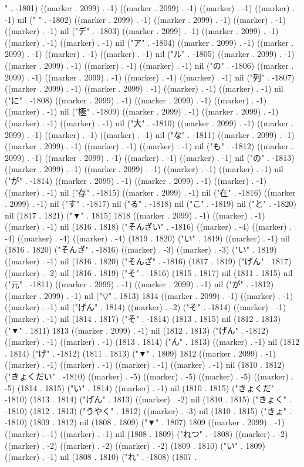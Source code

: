 " . -1801) ((marker . 2099) . -1) ((marker . 2099) . -1) ((marker) . -1) ((marker) . -1) nil (" " . -1802) ((marker . 2099) . -1) ((marker . 2099) . -1) ((marker) . -1) ((marker) . -1) nil ("デ" . -1803) ((marker . 2099) . -1) ((marker . 2099) . -1) ((marker) . -1) ((marker) . -1) nil ("ア" . -1804) ((marker . 2099) . -1) ((marker . 2099) . -1) ((marker) . -1) ((marker) . -1) nil ("ル" . -1805) ((marker . 2099) . -1) ((marker . 2099) . -1) ((marker) . -1) ((marker) . -1) nil ("の" . -1806) ((marker . 2099) . -1) ((marker . 2099) . -1) ((marker) . -1) ((marker) . -1) nil ("列" . -1807) ((marker . 2099) . -1) ((marker . 2099) . -1) ((marker) . -1) ((marker) . -1) nil ("に" . -1808) ((marker . 2099) . -1) ((marker . 2099) . -1) ((marker) . -1) ((marker) . -1) nil ("極" . -1809) ((marker . 2099) . -1) ((marker . 2099) . -1) ((marker) . -1) ((marker) . -1) nil ("大" . -1810) ((marker . 2099) . -1) ((marker . 2099) . -1) ((marker) . -1) ((marker) . -1) nil ("な" . -1811) ((marker . 2099) . -1) ((marker . 2099) . -1) ((marker) . -1) ((marker) . -1) nil ("も" . -1812) ((marker . 2099) . -1) ((marker . 2099) . -1) ((marker) . -1) ((marker) . -1) nil ("の" . -1813) ((marker . 2099) . -1) ((marker . 2099) . -1) ((marker) . -1) ((marker) . -1) nil ("が" . -1814) ((marker . 2099) . -1) ((marker . 2099) . -1) ((marker) . -1) ((marker) . -1) nil ("存" . -1815) ((marker . 2099) . -1) nil ("在" . -1816) ((marker . 2099) . -1) nil ("す" . -1817) nil ("る" . -1818) nil ("こ" . -1819) nil ("と" . -1820) nil (1817 . 1821) ("▼" . 1815) 1818 ((marker . 2099) . -1) ((marker) . -1) ((marker) . -1) nil (1816 . 1818) ("そんざい" . -1816) ((marker) . -4) ((marker) . -4) ((marker) . -4) ((marker) . -4) (1819 . 1820) ("い" . 1819) ((marker) . -1) nil (1816 . 1820) ("そんざ" . -1816) ((marker) . -3) ((marker) . -3) ("い" . 1819) ((marker) . -1) nil (1816 . 1820) ("そんざ" . -1816) (1817 . 1819) ("げん" . 1817) ((marker) . -2) nil (1816 . 1819) ("そ" . -1816) (1815 . 1817) nil (1811 . 1815) nil ("元" . -1811) ((marker . 2099) . -1) ((marker . 2099) . -1) nil ("が" . -1812) ((marker . 2099) . -1) nil ("▽" . 1813) 1814 ((marker . 2099) . -1) ((marker) . -1) ((marker) . -1) nil ("げん" . 1814) ((marker) . -2) ("そ" . -1814) ((marker) . -1) ((marker) . -1) nil (1814 . 1817) ("そ" . -1814) (1813 . 1815) nil (1812 . 1813) ("▼" . 1811) 1813 ((marker . 2099) . -1) nil (1812 . 1813) ("げん" . -1812) ((marker) . -1) ((marker) . -1) (1813 . 1814) ("ん" . 1813) ((marker) . -1) nil (1812 . 1814) ("げ" . -1812) (1811 . 1813) ("▼" . 1809) 1812 ((marker . 2099) . -1) ((marker) . -1) ((marker) . -1) ((marker) . -1) ((marker) . -1) nil (1810 . 1812) ("きょくだい" . -1810) ((marker) . -5) ((marker) . -5) ((marker) . -5) ((marker) . -5) (1814 . 1815) ("い" . 1814) ((marker) . -1) nil (1810 . 1815) ("きょくだ" . -1810) (1813 . 1814) ("げん" . 1813) ((marker) . -2) nil (1810 . 1815) ("きょく" . -1810) (1812 . 1813) ("うやく" . 1812) ((marker) . -3) nil (1810 . 1815) ("きょ" . -1810) (1809 . 1812) nil (1808 . 1809) ("▼" . 1807) 1809 ((marker . 2099) . -1) ((marker) . -1) ((marker) . -1) nil (1808 . 1809) ("れつ" . -1808) ((marker) . -2) ((marker) . -2) ((marker) . -2) ((marker) . -2) (1809 . 1810) ("い" . 1809) ((marker) . -1) nil (1808 . 1810) ("れ" . -1808) (1807 . 